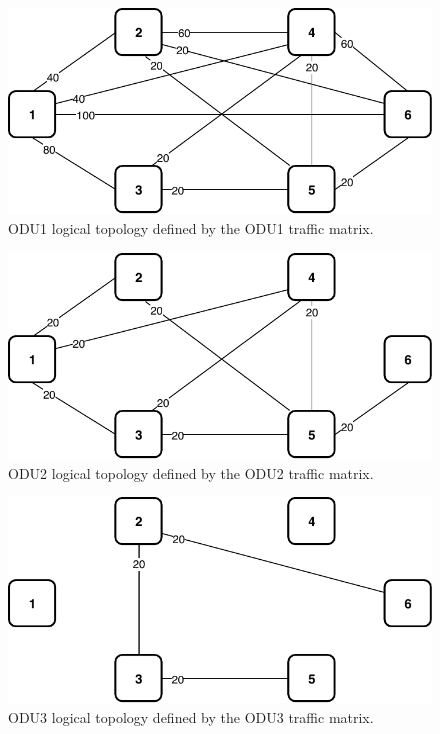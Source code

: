 \begin{figure}[h!]
\centering
\includegraphics[width=12cm]{sdf/ilp/transparent_survivability/figures/logical_topology_ODU1_high}
\caption{ODU1 logical topology defined by the ODU1 traffic matrix.}
\label{logical2_ODU1_high}
\end{figure}

\begin{figure}[h!]
\centering
\includegraphics[width=12cm]{sdf/ilp/transparent_survivability/figures/logical_topology_ODU2_high}
\caption{ODU2 logical topology defined by the ODU2 traffic matrix.}
\label{logical2_ODU2_high}
\end{figure}

\begin{figure}[h!]
\centering
\includegraphics[width=12cm]{sdf/ilp/transparent_survivability/figures/logical_topology_ODU3_high}
\caption{ODU3 logical topology defined by the ODU3 traffic matrix.}
\label{logical2_ODU3_high}
\end{figure}

